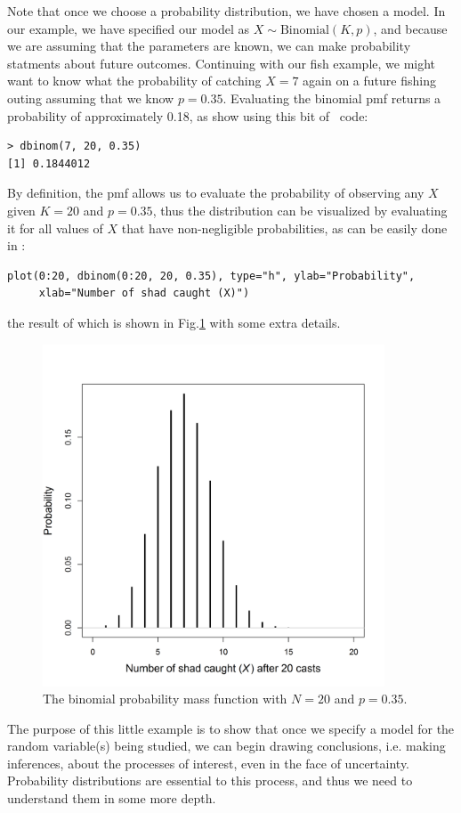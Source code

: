 Note that once we choose a probability distribution, we have chosen a
model. In our example, we have specified our model as $X \sim
\text{Binomial}(K,p)$, and because we are assuming that the parameters are
known, we can make probability statments about future
outcomes. Continuing with our fish example, we might want to know what
the probability of catching $X=7$ again on a future fishing outing
assuming that we know $p=0.35$. Evaluating the binomial pmf returns a
probability of approximately 0.18, as show using this bit of \R~code:
\begin{verbatim}
> dbinom(7, 20, 0.35)
[1] 0.1844012
\end{verbatim}
By definition, the pmf allows us to evaluate the probability of observing
any $X$ given $K=20$ and $p=0.35$, thus the distribution %
can be visualized by evaluating it for all values of $X$ that have
non-negligible probabilities, as can be easily done in \R:
\begin{verbatim}
plot(0:20, dbinom(0:20, 20, 0.35), type="h", ylab="Probability",
     xlab="Number of shad caught (X)")
\end{verbatim}
the result of which is shown in Fig.\ref{modeling.fig.bin} with some extra details.
\begin{figure}[ht!]
  \centering
  \includegraphics[width=4in,height=4in]{Ch1b/figs/bin}
\caption{The binomial probability mass function with $N=20$ and
  $p=0.35$. }
\label{modeling.fig.bin}
\end{figure}

The purpose of this little example is to show that once we specify a
model for the random variable(s) being studied, we can begin drawing
conclusions, i.e. making inferences, about the processes of interest,
even in the face of uncertainty. Probability distributions are
essential to this process, and thus we need to
understand them in some more depth.


